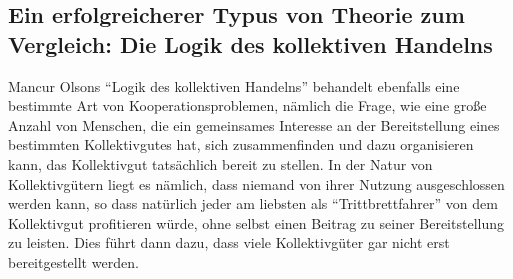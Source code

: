 \documentclass[12pt,a4paper,ngerman]{article}
\begin{document}
\subsection{Ein erfolgreicherer Typus von Theorie zum Vergleich: 
Die Logik des kollektiven Handelns}

Mancur Olsons "`Logik des kollektiven Handelns"' \cite{olson:1965}
behandelt ebenfalls eine bestimmte Art von Kooperationsproblemen,
nämlich die Frage, wie eine große Anzahl von Menschen, die ein
gemeinsames Interesse an der Bereitstellung eines bestimmten
Kollektivgutes hat, sich zusammenfinden und dazu organisieren kann,
das Kollektivgut tatsächlich bereit zu stellen. In der Natur von
Kollektivgütern liegt es nämlich, dass niemand von ihrer Nutzung
ausgeschlossen werden kann, so dass natürlich jeder am liebsten als
"`Trittbrettfahrer"' von dem Kollektivgut profitieren würde, ohne
selbst einen Beitrag zu seiner Bereitstellung zu leisten. Dies führt
dann dazu, dass viele Kollektivgüter gar nicht erst bereitgestellt
werden.
\end{document}
